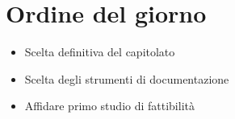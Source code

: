 \section{Ordine del giorno}
\begin{itemize}
\item Scelta definitiva del capitolato
\item Scelta degli strumenti di documentazione
\item Affidare primo studio di fattibilità

\end{itemize}